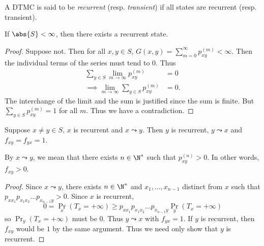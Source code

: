 \begin{definition}
    A DTMC is said to be \emph{recurrent} (resp. \emph{transient}) if all
    states are recurrent (resp. transient).
\end{definition}

\begin{theorem}
    If $\abs{S} < \infty$, then there exists a recurrent state.
\end{theorem}
\begin{proof}
    Suppose not.
    Then for all $x, y \in S$, $G(x, y) = \sum_{m=0}^{\infty} p_{xy}^{(m)}
    < \infty$.
    Then the individual terms of the series must tend to $0$.
    Thus \begin{align*} %
        \sum_{y \in S} \lim_{m \to \infty} p_{xy}^{(m)}
            &= 0 \\
        \implies \lim_{m \to \infty} \sum_{y \in S} p_{xy}^{(m)}
            &= 0.
    \end{align*}
    The interchange of the limit and the sum is justified since the sum
    is finite.
    But $\sum_{y \in S} p_{xy}^{(m)} = 1$ for all $m$. %
    Thus we have a contradiction.
\end{proof}

\begin{theorem}
    Suppose $x \ne y \in S$, $x$ is recurrent and $x \leadsto y$.
    Then $y$ is recurrent, $y \leadsto x$ and $f_{xy} = f_{yx} = 1$.
\end{theorem}
By $x \leadsto y$, we mean that there exists $n \in \N^*$ such that
$p_{xy}^{(n)} > 0$.
In other words, $f_{xy} > 0$.
\begin{proof}
    Since $x \leadsto y$, there exists $n \in \N^*$ and $x_1,\dots,x_{n-1}$
    distinct from $x$ such that $p_{xx_1}p_{x_1x_2}\dots p_{x_{n-1}y} > 0$.
    Since $x$ is recurrent, \[
        0 = \Pr_x(T_x = +\infty)
            \ge p_{xx_1}p_{x_1x_2}\dots p_{x_{n-1}y} \Pr_y(T_x = +\infty)
    \] so $\Pr_y(T_x = +\infty)$ must be $0$.
    Thus $y \leadsto x$ with $f_{yx} = 1$.
    If $y$ is recurrent, then $f_{xy}$ would be $1$ by the same argument.
    Thus we need only show that $y$ is recurrent.
\end{proof}
